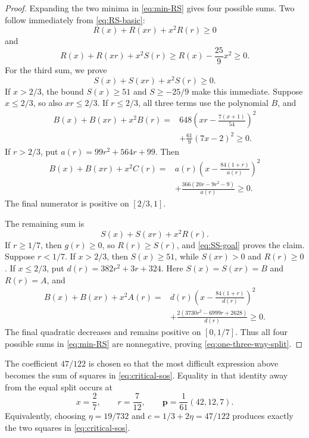 \documentclass[11pt]{article}
\numberwithin{equation}{section}
\theoremstyle{remark}
\begin{document}
\begin{proof}
Expanding the two minima in \eqref{eq:min-RS} gives four possible sums.
Two follow immediately from \eqref{eq:RS-basic}:
\[
 R(x)+R(xr)+x^2R(r)\ge0
\]
and
\[
 R(x)+R(xr)+x^2S(r)
 \ge R(x)-\frac{25}{9}x^2\ge0.
\]
For the third sum, we prove
\begin{equation}\label{eq:SS-goal}
 S(x)+S(xr)+x^2S(r)\ge0.
\end{equation}
If $x>2/3$, the bound $S(x)\ge51$ and
$S\ge-25/9$ make this immediate.  Suppose $x\le2/3$, so also
$xr\le2/3$.  If $r\le2/3$, all three terms use the polynomial $B$, and
\begin{equation}\label{eq:critical-sos}
 \begin{aligned}
 B(x)+B(xr)+x^2B(r)
 ={}&648\left(xr-\frac{7(x+1)}{54}\right)^2\\
 &+\frac{61}{9}(7x-2)^2\ge0.
 \end{aligned}
\end{equation}
If $r>2/3$, put $a(r)=99r^2+564r+99$.  Then
\begin{equation}\label{eq:SS-large-r}
 \begin{aligned}
 B(x)+B(xr)+x^2C(r)
 ={}&a(r)\left(x-\frac{84(1+r)}{a(r)}\right)^2\\
 &+\frac{366(20r-9r^2-9)}{a(r)}\ge0.
 \end{aligned}
\end{equation}
The final numerator is positive on $[2/3,1]$.

The remaining sum is
\begin{equation}\label{eq:SR-goal}
 S(x)+S(xr)+x^2R(r).
\end{equation}
If $r\ge1/7$, then $g(r)\ge0$, so $R(r)\ge S(r)$, and
\eqref{eq:SS-goal} proves the claim.  Suppose $r<1/7$.  If $x>2/3$,
then $S(x)\ge51$, while $S(xr)>0$ and $R(r)\ge0$.  If $x\le2/3$, put
$d(r)=382r^2+3r+324$.  Here $S(x)=S(xr)=B$ and $R(r)=A$, and
\begin{equation}\label{eq:SR-small-r}
 \begin{aligned}
 B(x)+B(xr)+x^2A(r)
 ={}&d(r)\left(x-\frac{84(1+r)}{d(r)}\right)^2\\
 &+\frac{2(3730r^2-6999r+2628)}{d(r)}\ge0.
 \end{aligned}
\end{equation}
The final quadratic decreases and remains positive on $[0,1/7]$.
Thus all four possible sums in \eqref{eq:min-RS} are nonnegative, proving
\eqref{eq:one-three-way-split}.
\end{proof}
The coefficient $47/122$ is chosen so that the most difficult expression
above becomes the sum of squares in \eqref{eq:critical-sos}.  Equality in
that identity away from the equal split occurs at
\begin{equation}\label{eq:equality-distribution}
 x=\frac27,
 \qquad
 r=\frac7{12},
 \qquad
 \mathbf p=\frac1{61}(42,12,7).
\end{equation}
Equivalently, choosing $\eta=19/732$ and
$c=1/3+2\eta=47/122$ produces exactly the two squares in
\eqref{eq:critical-sos}.
\end{document}
